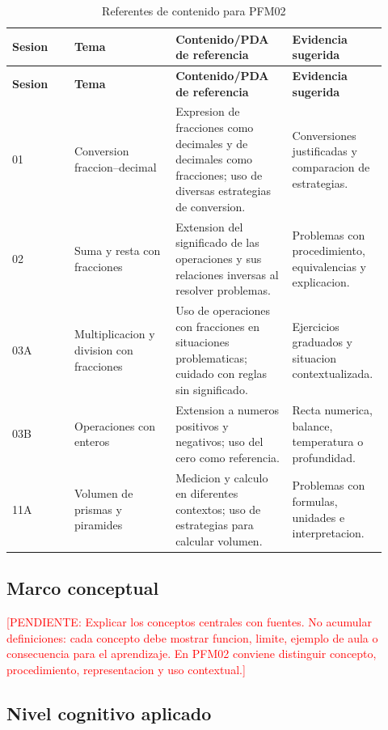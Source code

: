 \documentclass[
	spanish,
	letterpaper, oneside
]{article}
\newcommand{\pendiente}[1]{\textcolor{red}{[PENDIENTE: #1]}}
\begin{document}
\begin{longtable}{@{}p{0.16\linewidth}p{0.26\linewidth}p{0.30\linewidth}p{0.20\linewidth}@{}}
	\caption{Referentes de contenido para PFM02}\label{tab:contenidos-pfm02}\\
	\toprule
	\textbf{Sesion} & \textbf{Tema} & \textbf{Contenido/PDA de referencia} & \textbf{Evidencia sugerida} \\
	\midrule
	\endfirsthead
	\toprule
	\textbf{Sesion} & \textbf{Tema} & \textbf{Contenido/PDA de referencia} & \textbf{Evidencia sugerida} \\
	\midrule
	\endhead
	01 & Conversion fraccion--decimal & Expresion de fracciones como decimales y de decimales como fracciones; uso de diversas estrategias de conversion. & Conversiones justificadas y comparacion de estrategias. \\
	02 & Suma y resta con fracciones & Extension del significado de las operaciones y sus relaciones inversas al resolver problemas. & Problemas con procedimiento, equivalencias y explicacion. \\
	03A & Multiplicacion y division con fracciones & Uso de operaciones con fracciones en situaciones problematicas; cuidado con reglas sin significado. & Ejercicios graduados y situacion contextualizada. \\
	03B & Operaciones con enteros & Extension a numeros positivos y negativos; uso del cero como referencia. & Recta numerica, balance, temperatura o profundidad. \\
	11A & Volumen de prismas y piramides & Medicion y calculo en diferentes contextos; uso de estrategias para calcular volumen. & Problemas con formulas, unidades e interpretacion. \\
	\bottomrule
\end{longtable}

\subsection{Marco conceptual}

\pendiente{Explicar los conceptos centrales con fuentes. No acumular definiciones: cada concepto debe mostrar funcion, limite, ejemplo de aula o consecuencia para el aprendizaje. En PFM02 conviene distinguir concepto, procedimiento, representacion y uso contextual.}

\subsection{Nivel cognitivo aplicado}
\end{document}
